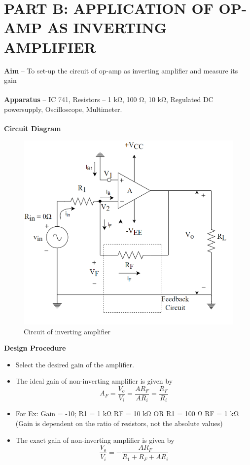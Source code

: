 \documentclass[9pt]{scrreprt}
\begin{document}
\section*{\normalsize PART B: APPLICATION OF OP-AMP AS INVERTING AMPLIFIER}
\textbf{Aim} – To set-up the circuit of op-amp as inverting amplifier and measure its gain\\
\\
\textbf{Apparatus} – IC 741, Resistors – 1 k$\si{\ohm}$, 100 $\si{\ohm}$, 10 k$\si{\ohm}$, Regulated DC powersupply, Oscilloscope, Multimeter.\\
\\
\textbf{Circuit Diagram}
\begin{figure}[H]
	\centering
	\includegraphics[width=0.45\linewidth]{logos/Inv_amp.png}
	\caption{Circuit of inverting amplifier}
	\label{fig:Inv_amp}
\end{figure}

\textbf{Design Procedure}
\begin{itemize}
\item Select the desired gain of the amplifier.
\item The ideal gain of non-inverting amplifier is given by
\begin{equation*}
A_F = \frac{V_o}{V_i} = \frac{A R_F}{A R_i} = \frac{R_F}{R_i}
\end{equation*}

\item For Ex: Gain = -10; R1 = 1 k$\si{\ohm}$ RF = 10 k$\si{\ohm}$ OR R1 = 100 $\si{\ohm}$ RF = 1 k$\si{\ohm}$ (Gain is dependent on the ratio of resistors, not the absolute values)
\item The exact gain of non-inverting amplifier is given by
\begin{equation*}
\frac{V_o}{V_i} = - \frac{A R_F}{R_1 + R_F + A R_i}
\end{equation*}
\end{itemize}
\end{document}

